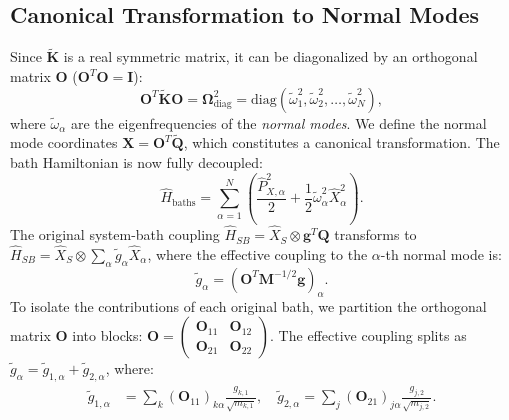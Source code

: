 \subsection{Canonical Transformation to Normal Modes}
Since $\tilde{\mathbf{K}}$ is a real symmetric matrix, it can be diagonalized by an orthogonal matrix $\mathbf{O}$ ($\mathbf{O}^T \mathbf{O} = \mathbf{I}$):
\begin{equation}
\mathbf{O}^T \tilde{\mathbf{K}} \mathbf{O} = \mathbf{\Omega}_{\text{diag}}^2 = \text{diag}(\tilde{\omega}_1^2, \tilde{\omega}_2^2, \dots, \tilde{\omega}_N^2),
\label{eq:diagonalization}
\end{equation}
where $\tilde{\omega}_\alpha$ are the eigenfrequencies of the \textit{normal modes}. We define the normal mode coordinates $\mathbf{X} = \mathbf{O}^T \tilde{\mathbf{Q}}$, which constitutes a canonical transformation. The bath Hamiltonian is now fully decoupled:
\begin{equation}
\hat{H}_{\text{baths}} = \sum_{\alpha=1}^{N} \left( \frac{\hat{P}_{X,\alpha}^2}{2} + \frac{1}{2} \tilde{\omega}_\alpha^2 \hat{X}_\alpha^2 \right).
\label{eq:H_normal_modes}
\end{equation}
The original system-bath coupling $\hat{H}_{SB} = \hat{X}_S \otimes \mathbf{g}^T \mathbf{Q}$ transforms to $\hat{H}_{SB} = \hat{X}_S \otimes \sum_\alpha \tilde{g}_\alpha \hat{X}_\alpha$, where the effective coupling to the $\alpha$-th normal mode is:
\begin{equation}
\tilde{g}_\alpha = \left( \mathbf{O}^T \mathbf{M}^{-1/2} \mathbf{g} \right)_\alpha.
\label{eq:g_tilde}
\end{equation}
To isolate the contributions of each original bath, we partition the orthogonal matrix $\mathbf{O}$ into blocks: $\mathbf{O} = \begin{pmatrix} \mathbf{O}_{11} & \mathbf{O}_{12} \\ \mathbf{O}_{21} & \mathbf{O}_{22} \end{pmatrix}$. The effective coupling splits as $\tilde{g}_\alpha = \tilde{g}_{1,\alpha} + \tilde{g}_{2,\alpha}$, where:
\begin{align}
\tilde{g}_{1,\alpha} &= \sum_{k} (\mathbf{O}_{11})_{k\alpha} \frac{g_{k,1}}{\sqrt{m_{k,1}}}, \quad
\tilde{g}_{2,\alpha} = \sum_{j} (\mathbf{O}_{21})_{j\alpha} \frac{g_{j,2}}{\sqrt{m_{j,2}}}.
\label{eq:g_split}
\end{align}

